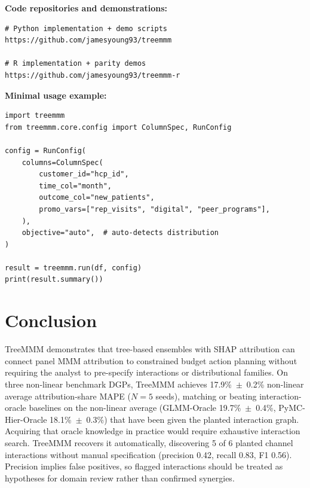 \documentclass[review,12pt]{elsarticle}
\begin{document}
\textbf{Code repositories and demonstrations:}
\begin{lstlisting}
# Python implementation + demo scripts
https://github.com/jamesyoung93/treemmm

# R implementation + parity demos
https://github.com/jamesyoung93/treemmm-r
\end{lstlisting}

\textbf{Minimal usage example:}
\begin{lstlisting}
import treemmm
from treemmm.core.config import ColumnSpec, RunConfig

config = RunConfig(
    columns=ColumnSpec(
        customer_id="hcp_id",
        time_col="month",
        outcome_col="new_patients",
        promo_vars=["rep_visits", "digital", "peer_programs"],
    ),
    objective="auto",  # auto-detects distribution
)

result = treemmm.run(df, config)
print(result.summary())
\end{lstlisting}

\section{Conclusion}
\label{sec:conclusion}

TreeMMM demonstrates that tree-based ensembles with SHAP attribution can
connect panel MMM attribution to constrained budget action planning without
requiring the analyst to pre-specify interactions or distributional families.
On three non-linear benchmark DGPs, TreeMMM achieves 17.9\%~$\pm$~0.2\%
non-linear average attribution-share MAPE ($N{=}5$ seeds), matching or beating
interaction-oracle baselines on the non-linear average (GLMM-Oracle
19.7\%~$\pm$~0.4\%, PyMC-Hier-Oracle 18.1\%~$\pm$~0.3\%) that have been given
the planted interaction graph. Acquiring that oracle knowledge in practice
would require exhaustive interaction search. TreeMMM recovers it automatically,
discovering 5 of 6 planted channel interactions without manual specification
(precision 0.42, recall 0.83, F1 0.56). Precision implies false positives, so
flagged interactions should be treated as hypotheses for domain review rather
than confirmed synergies.
\end{document}
